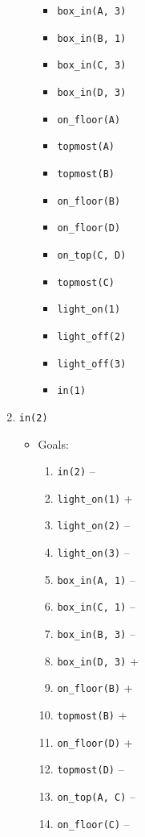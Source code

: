 \documentclass[12pt]{article}
\begin{document}
\begin{enumerate}
\begin{itemize}
\begin{itemize}
          \item \texttt{box\_in(A, 3)}
          \item \texttt{box\_in(B, 1)}
          \item \texttt{box\_in(C, 3)}
          \item \texttt{box\_in(D, 3)}
          \item \texttt{on\_floor(A)}
          \item \texttt{topmost(A)}
          \item \texttt{topmost(B)}
          \item \texttt{on\_floor(B)}
          \item \texttt{on\_floor(D)}
          \item \texttt{on\_top(C, D)}
          \item \texttt{topmost(C)}
          \item \texttt{light\_on(1)}
          \item \texttt{light\_off(2)}
          \item \texttt{light\_off(3)}
          \item \texttt{in(1)}
        \end{itemize}
    \end{itemize}
  \item \texttt{in(2)}
    \begin{itemize}
      \item Goals:
        \begin{enumerate}
          \item \texttt{in(2)} --
          \item \texttt{light\_on(1)} +
          \item \texttt{light\_on(2)} --
          \item \texttt{light\_on(3)} --
          \item \texttt{box\_in(A, 1)} --
          \item \texttt{box\_in(C, 1)} --
          \item \texttt{box\_in(B, 3)} --
          \item \texttt{box\_in(D, 3)} +
          \item \texttt{on\_floor(B)} +
          \item \texttt{topmost(B)} +
          \item \texttt{on\_floor(D)} +
          \item \texttt{topmost(D)} --
          \item \texttt{on\_top(A, C)} --
          \item \texttt{on\_floor(C)} --

\end{enumerate}
\end{itemize}
\end{enumerate}
\end{document}
